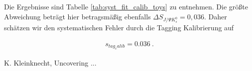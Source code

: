 \documentclass[a4paper]{scrbook}
\newcommand{\SJPsi}{S_{J/\Psi K_s^0}}
\begin{document}
Die Ergebnisse sind Tabelle \ref{tab:syst_fit_calib_toys} zu entnehmen. Die größte Abweichung beträgt hier betragsmäßig ebenfalls $\Delta\SJPsi = 0,036$. Daher schätzen wir den systematischen Fehler durch die Tagging Kalibrierung auf 

\begin{align}
s_{tag_calib} = 0.036 \ .
\end{align}

\begin{thebibliography}{---}
  K. Kleinknecht, Uncovering ...
\end{thebibliography}

\printglossaries 

\end{document}
